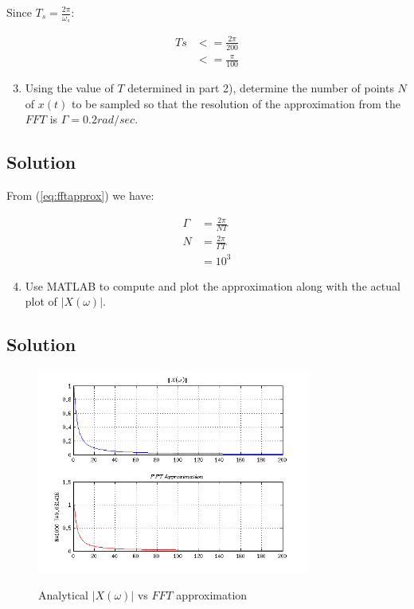 Since $T_s = \frac{2\pi}{\omega_s}$:

\begin{equation*}
\begin{aligned}
Ts &<= \frac{2\pi}{200} \\
&<= \frac{\pi}{100}
\end{aligned}
\end{equation*} 

\begin{enumerate}
\setcounter{enumi}{2}
\item Using the value of $T$ determined in part 2), 
determine the number of points $N$ of $x(t)$ to be sampled so
that the resolution of the approximation from the $FFT$ is $\Gamma = 0.2 rad/sec$.
\end{enumerate} 

\subsection*{Solution}
From (\ref{eq:fftapprox}) we have:

\begin{equation*}
\begin{aligned}
\Gamma &= \frac{2\pi}{N T} \\
N &= \frac{2\pi}{\Gamma T} \\
&= 10^3
\end{aligned}
\end{equation*} 

\begin{enumerate}
\setcounter{enumi}{3}
\item Use MATLAB to compute and plot the approximation along with the actual 
plot of $|X(\omega)|$.
\end{enumerate} 

\subsection*{Solution}


\begin{figure}[H]
\caption{Analytical $|X(\omega)|$ vs $FFT$ approximation}
\centering
\includegraphics[width=0.8\textwidth]{figs/c4p8.png}
\label{fig:c4p8}
\end{figure} 
